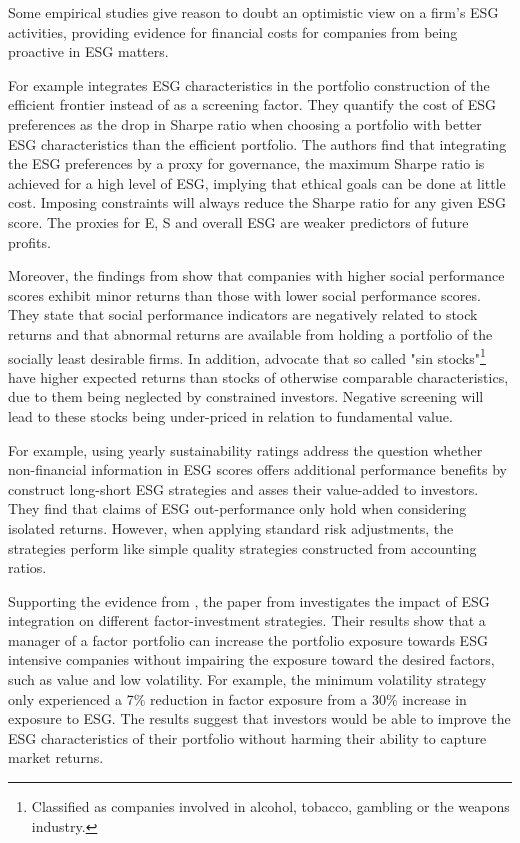 Some empirical studies give reason to doubt an optimistic view on a firm's ESG activities, providing evidence for financial costs for companies from being proactive in ESG matters. 

For example \cite{ESG_Frontier} integrates ESG characteristics in the portfolio construction of the efficient frontier instead of as a screening factor. They quantify the cost of ESG preferences as the drop in Sharpe ratio when choosing a portfolio with better ESG characteristics than the efficient portfolio. The authors find that integrating the ESG preferences by a proxy for governance, the maximum Sharpe ratio is achieved for a high level of ESG, implying that ethical goals can be done at little cost. Imposing constraints will always reduce the Sharpe ratio for any given ESG score. The proxies for E, S and overall ESG are weaker predictors of future profits. 

Moreover, the findings from \citep{uk_ESG_stock} show that companies with higher social performance scores exhibit minor returns than those with lower social performance scores. They state that social performance indicators are negatively related to stock returns and that abnormal returns are available from holding a portfolio of the socially least desirable firms. In addition, \cite{Kacperczyk_sin_stocks} advocate that so called "sin stocks"\footnote{Classified as companies involved in alcohol, tobacco, gambling or the weapons industry. } have higher expected returns than stocks of otherwise comparable characteristics, due to them being neglected by constrained investors. Negative screening will lead to these stocks being under-priced in relation to fundamental value.   

For example, using yearly sustainability ratings \cite{Shrunk_ESG_ALPHA} address the question whether non-financial information in ESG scores offers additional performance benefits by construct long-short ESG strategies and asses their value-added to investors. They find that claims of ESG out-performance only hold when considering isolated returns. However, when applying standard risk adjustments, the strategies perform like simple quality strategies constructed from accounting ratios. 


Supporting the evidence from \cite{ESG_meta_analysis}, the paper from \cite{factor_ESG_integration} investigates the impact of ESG integration on different factor-investment strategies. Their results show that a manager of a factor portfolio can increase the portfolio exposure towards ESG intensive companies without impairing the exposure toward the desired factors, such as value and low volatility. For example, the minimum volatility strategy only experienced a 7\% reduction in factor exposure from a 30\% increase in exposure to ESG. The results suggest that investors would be able to improve the ESG characteristics of their portfolio without harming their ability to capture market returns. 

